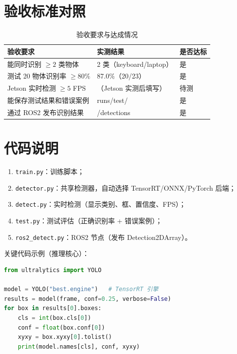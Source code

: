 \documentclass[zihao=-4, a4paper]{ctexart}
\newcommand{\tabhead}[1]{\textbf{\color{white}#1}}
\begin{document}
\section{验收标准对照}
\begin{table}[H]
    \centering
    \begin{tabular}{@{}p{6.2cm}p{3.2cm}p{3.2cm}@{}}
        \hline
        \rowcolor{primary}
        \tabhead{验收要求} & \tabhead{实测结果} & \tabhead{是否达标} \\
        \hline
        能同时识别 $\geq 2$ 类物体 & 2 类（keyboard/laptop） & 是 \\
        测试 20 物体识别率 $\geq 80\%$ & 87.0\%（20/23） & 是 \\
        Jetson 实时检测 $\geq 5$ FPS & （Jetson 实测后填写） & 待测 \\
        能保存测试结果和错误案例 & runs/test/ & 是 \\
        通过 ROS2 发布识别结果 & /detections & 是 \\
        \hline
    \end{tabular}
    \caption{验收要求与达成情况}
\end{table}

\section{代码说明}
\begin{enumerate}[label=\arabic*., leftmargin=2em]
    \item \texttt{train.py}：训练脚本；
    \item \texttt{detector.py}：共享检测器，自动选择 TensorRT/ONNX/PyTorch 后端；
    \item \texttt{detect.py}：实时检测（显示类别、框、置信度、FPS）；
    \item \texttt{test.py}：测试评估（正确识别率 + 错误案例）；
    \item \texttt{ros2\_detect.py}：ROS2 节点（发布 Detection2DArray）。
\end{enumerate}

关键代码示例（推理核心）：
\begin{lstlisting}[language=Python, caption={检测推理}]
from ultralytics import YOLO

model = YOLO("best.engine")   # TensorRT 引擎
results = model(frame, conf=0.25, verbose=False)
for box in results[0].boxes:
    cls = int(box.cls[0])
    conf = float(box.conf[0])
    xyxy = box.xyxy[0].tolist()
    print(model.names[cls], conf, xyxy)
\end{lstlisting}
\end{document}
